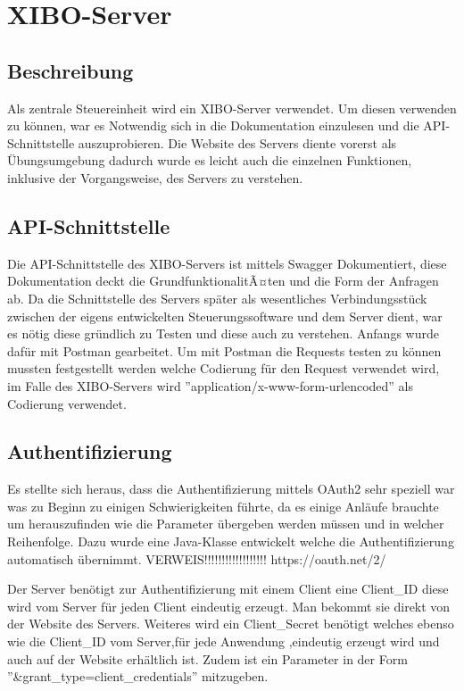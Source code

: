 \chapter{XIBO-Server}
\section{Beschreibung}
Als zentrale Steuereinheit wird ein XIBO-Server verwendet. Um diesen verwenden zu können, war es Notwendig sich in die Dokumentation einzulesen und die API-Schnittstelle auszuprobieren. Die Website des Servers diente vorerst als Übungsumgebung dadurch wurde es leicht auch die einzelnen Funktionen, inklusive der Vorgangsweise, des Servers zu verstehen.

\section{API-Schnittstelle}
Die API-Schnittstelle des XIBO-Servers ist mittels Swagger Dokumentiert, diese Dokumentation deckt die GrundfunktionalitÃ¤ten und die Form der Anfragen ab. Da die Schnittstelle des Servers später als wesentliches Verbindungsstück zwischen der eigens entwickelten Steuerungssoftware und dem Server dient, war es nötig diese gründlich zu Testen und diese auch zu verstehen. Anfangs wurde dafür mit Postman gearbeitet. Um mit Postman die Requests testen zu können mussten festgestellt werden welche Codierung für den Request verwendet wird, im Falle des XIBO-Servers wird ''application/x-www-form-urlencoded'' als Codierung verwendet.


\section{Authentifizierung}
Es stellte sich heraus, dass die Authentifizierung mittels OAuth2 sehr speziell war was zu Beginn zu einigen Schwierigkeiten führte, da es einige Anläufe brauchte um herauszufinden wie die Parameter übergeben werden müssen und in welcher Reihenfolge. Dazu wurde eine Java-Klasse entwickelt welche die Authentifizierung automatisch übernimmt.
VERWEIS!!!!!!!!!!!!!!!!!!
https://oauth.net/2/

Der Server benötigt zur Authentifizierung mit einem Client eine Client\_ID diese wird vom Server für jeden Client eindeutig erzeugt. Man bekommt sie direkt von der Website des Servers. 
Weiteres wird ein Client\_Secret benötigt welches ebenso wie die Client\_ID vom Server,für jede Anwendung ,eindeutig erzeugt wird und auch auf der Website erhältlich ist. Zudem ist ein Parameter in der Form ''&grant\_type=client\_credentials'' mitzugeben.

